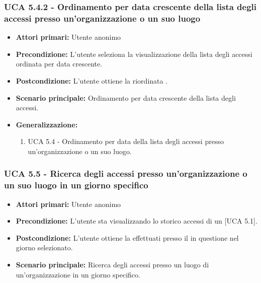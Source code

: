 \subsubsection{UCA 5.4.2 - Ordinamento per data crescente della lista degli accessi presso un'organizzazione o un suo luogo}
\begin{itemize}
    \item \textbf{Attori primari:} Utente anonimo
    \item \textbf{Precondizione:} L'utente seleziona la visualizzazione della lista degli accessi ordinata per data crescente.
    \item \textbf{Postcondizione:} L'utente ottiene la  riordinata .
    \item \textbf{Scenario principale:} Ordinamento per data crescente della lista degli accessi.
    \item \textbf{Generalizzazione:}
	\begin{enumerate}
		\item UCA 5.4 - Ordinamento per data della lista degli accessi presso un'organizzazione o un suo luogo.
	\end{enumerate}
\end{itemize}

\subsubsection{UCA 5.5 - Ricerca degli accessi presso un'organizzazione o un suo luogo in un giorno specifico}
\begin{itemize}
    \item \textbf{Attori primari:} Utente anonimo
    \item \textbf{Precondizione:} L'utente sta visualizzando lo storico accessi di un  [UCA 5.1].
    \item \textbf{Postcondizione:} L'utente ottiene la  effettuati presso il  in questione nel giorno selezionato.
    \item \textbf{Scenario principale:} Ricerca degli accessi presso un luogo di un'organizzazione in un giorno specifico.
\end{itemize}